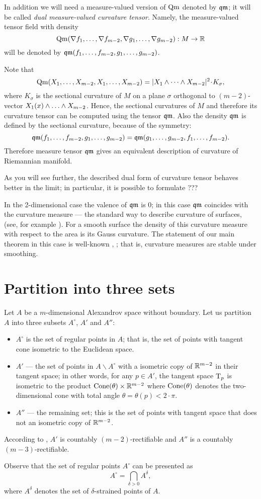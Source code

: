 In addition we will need a measure-valued version of $\operatorname{\rm Qm}$ denoted by $\operatorname{\mathfrak{qm}}$;
it will be called \emph{dual measure-valued curvature tensor}.
Namely, the measure-valued tensor field with density
\[\operatorname{\rm Qm}(\nabla f_1,\dots,\nabla f_{m-2},\nabla g_1,\dots,\nabla g_{m-2}): M\to\mathbb{R}\]
will be denoted by $\operatorname{\mathfrak{qm}}(f_1,\dots,f_{m-2},g_1,\dots,g_{m-2})$.


Note that 
$$\Qm(X_1,\dots,X_{m-2},X_1,\dots,X_{m-2})
=
|X_1\wedge\dots \wedge X_{m-2}|^2\cdot K_\sigma, $$
where $K_\sigma$ is the sectional curvature of $M$ 
on a plane $\sigma$ orthogonal to $(m-2)$-vector
$X_1(x)\wedge\zz\dots \wedge X_{m-2}$.
Hence, the sectional curvatures of $M$ and therefore its curvature tensor can  be computed using the tensor
$\operatorname{\mathfrak{qm}}$.
Also the density $\operatorname{\mathfrak{qm}}$ is defined by the sectional curvature,
because of the symmetry:
$$\operatorname{\mathfrak{qm}}(f_1,\dots,f_{m-2},g_1,\dots,g_{m-2})=
\operatorname{\mathfrak{qm}}(g_1,\dots,g_{m-2},f_1,\dots,f_{m-2}).$$
Therefore measure tensor $\operatorname{\mathfrak{qm}}$
gives an equivalent description of curvature of Riemannian manifold.

As you will see further, the described dual form of curvature tensor behaves better in the limit;
in particular, it is possible to formulate ??? 

In the 2-dimensional case the valence of $\operatorname{\mathfrak{qm}}$ is $0$;
in this case $\operatorname{\mathfrak{qm}}$ coincides with the curvature measure --- the standard way to describe curvature of surfaces, 
(see, for example \cite{R}).
For a smooth surface the density of this curvature measure with respect to the area
is its Gauss curvature.
The statement of our main theorem in this case
is well-known \cite[Theorem 8.4.2]{R}, \cite{AZ};
that is, curvature measures are stable under smoothing.


\section{Partition into three sets}

Let $A$ be a $m$-dimensional Alexandrov space without boundary. 
Let us partition $A$ into three subsets $A^\circ$, $A'$ and $A''$:
\begin{itemize}
\item $A^\circ$ is the set of regular points in $A$; that is, the set of points with tangent cone isometric to the Euclidean space.
\item $A'$ --- the set of points in $A\backslash A^\circ$ with a isometric copy of $\mathbb{R}^{m-2}$ in their tangent space;
in other words, for any $p\in A'$, the tangent space $\mathrm{T}_p$ is isometric to the product $\operatorname{Cone}(\theta)\times\mathbb{R}^{m-2}$ where $\operatorname{Cone}(\theta)$ denotes the two-dimensional cone with total angle $\theta=\theta(p)<2\cdot \pi$.
\item $A''$ --- the remaining set; this is the set of points with tangent space that does not an isometric copy of $\mathbb{R}^{m-2}$.
\end{itemize}
According to \cite{li-naber}, $A'$ is countably $(m-2)$-rectifiable and $A''$ is a countably $(m-3)$-rectifiable. 

Observe that the set of regular points $A^\circ$ can be presented as
$$A^{\circ}=\bigcap_{\delta>0} A^\delta,$$
where $A^\delta$ denotes the set of $\delta$-strained points of $A$.
